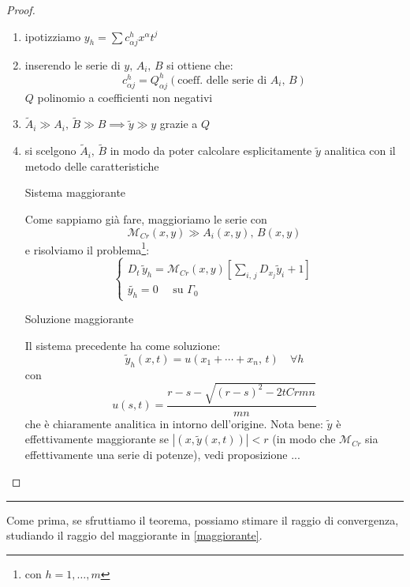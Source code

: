 \begin{proof}
\begin{enumerate}
\item ipotizziamo $y_h = \sum c^h_{\alpha j} x^\alpha t^j$
\item inserendo le serie di $y,\, A_i,\, B$ si ottiene che: 
$$ c^h_{\alpha j} = Q^h_{\alpha j}(\text{coeff. delle serie di }A_i, \, B)$$
$Q$ polinomio a coefficienti non negativi
\item $\widetilde{A}_i \gg A_i, \, \widetilde{B} \gg B \implies \widetilde{y} \gg y$ grazie a $Q$
\item si scelgono $\widetilde{A}_i, \, \widetilde{B}$ in modo da poter calcolare esplicitamente $\widetilde{y}$ analitica con il metodo delle caratteristiche

Sistema maggiorante

Come sappiamo già fare, maggioriamo le serie con 
$$\mathcal{M}_{Cr}(x,y) \gg A_i(x,y),\, B(x,y)$$
e risolviamo il problema\footnote{con $h=1,\ldots, m$}:
\begin{equation*}
\begin{cases}
D_t \, \widetilde{y}_h = \mathcal{M}_{Cr} (x,y) \left[\sum\limits_{i,\, j} D_{x_j}\widetilde{y}_i+1 \right] \\
\widetilde{y_h}=0 \quad \text{ su } \Gamma_0
\end{cases}
\end{equation*}



Soluzione maggiorante

Il sistema precedente ha come soluzione:
\begin{equation}\label{maggiorante}
\widetilde{y}_h(x,t)=u(x_1+\cdots +x_n,\,t) \quad \forall h
\end{equation}
con
\begin{equation}\label{sol}
u(s,t)=\frac{r-s-\sqrt{(r-s)^2-2tCrmn}}{mn}
\end{equation}
che è chiaramente analitica in intorno dell'origine. Nota bene: $\widetilde{y}$ è effettivamente maggiorante se $|(x,\widetilde{y}(x,t))|< r$ (in modo che $\mathcal{M}_{Cr}$ sia effettivamente una serie di potenze), vedi proposizione ...
\end{enumerate}
\end{proof}

\noindent\rule[0.5ex]{\linewidth}{0.2pt}

Come prima, se sfruttiamo il teorema, possiamo stimare il raggio di convergenza, studiando il raggio del maggiorante in \eqref{maggiorante}. 

